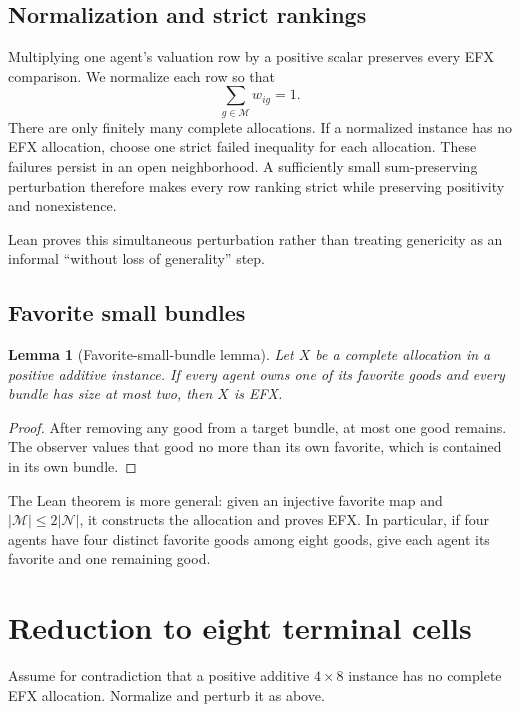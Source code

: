 \documentclass[11pt]{article}
\newtheorem{lemma}[theorem]{Lemma}
\theoremstyle{definition}
\newcommand{\N}{\mathcal{N}}
\newcommand{\M}{\mathcal{M}}
\begin{document}
\subsection{Normalization and strict rankings}

Multiplying one agent's valuation row by a positive scalar preserves every
EFX comparison. We normalize each row so that
\[
  \sum_{g\in\M}w_{ig}=1.
\]
There are only finitely many complete allocations. If a normalized instance
has no EFX allocation, choose one strict failed inequality for each
allocation. These failures persist in an open neighborhood. A sufficiently
small sum-preserving perturbation therefore makes every row ranking strict
while preserving positivity and nonexistence.

Lean proves this simultaneous perturbation rather than treating genericity as
an informal ``without loss of generality'' step.

\subsection{Favorite small bundles}

\begin{lemma}[Favorite-small-bundle lemma]\label{lem:favorites}
Let $X$ be a complete allocation in a positive additive instance. If every
agent owns one of its favorite goods and every bundle has size at most two,
then $X$ is EFX.
\end{lemma}

\begin{proof}
After removing any good from a target bundle, at most one good remains. The
observer values that good no more than its own favorite, which is contained
in its own bundle.
\end{proof}

The Lean theorem is more general: given an injective favorite map and
$|\M|\le2|\N|$, it constructs the allocation and proves EFX. In particular,
if four agents have four distinct favorite goods among eight goods, give each
agent its favorite and one remaining good.

\section{Reduction to eight terminal cells}

Assume for contradiction that a positive additive $4\times8$ instance has no
complete EFX allocation. Normalize and perturb it as above.
\end{document}
